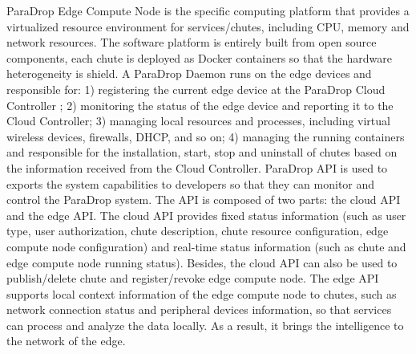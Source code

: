 {ParaDrop Edge Compute Node is the specific computing platform that provides a virtualized resource environment for services/chutes, including CPU, memory and network resources. The software platform is entirely built from open source components, each chute is deployed as Docker containers so that the hardware heterogeneity is shield. A ParaDrop Daemon runs on the edge devices and responsible for: 1) registering the current edge device at the ParaDrop Cloud Controller ; 2) monitoring the status of the edge device and reporting it to the Cloud Controller; 3) managing local resources and processes, including virtual wireless devices, firewalls, DHCP, and so on; 4) managing the running containers and responsible for the installation, start, stop and uninstall of chutes based on the information received from the Cloud Controller.
ParaDrop API is used to exports the system capabilities to developers so that they can monitor and control the ParaDrop system. The API is composed of two parts: the cloud API and the edge API. The cloud API provides fixed status information (such as user type, user authorization, chute description, chute resource configuration, edge compute node configuration) and real-time status information (such as chute and edge compute node running status). Besides, the cloud API can also be used to publish/delete chute and register/revoke edge compute node. The edge API supports local context information of the edge compute node to chutes, such as network connection status and peripheral devices information, so that services can process and analyze the data locally. As a result, it brings the intelligence to the network of the edge.

}

